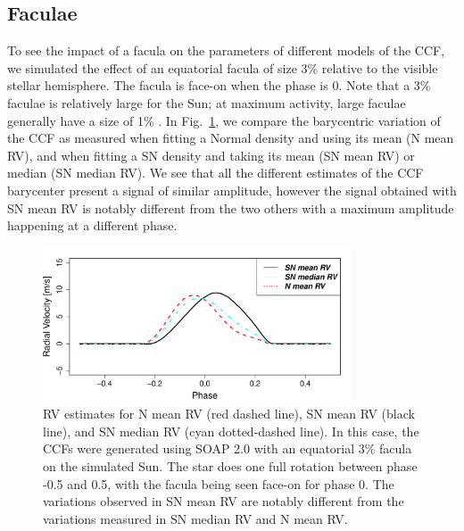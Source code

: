 \documentclass{aa}
\newcommand{\jessi}[1]{{\color{Purple}[[\textbf{Jessi: }#1]]}}
\begin{document}
\subsection{Faculae} \label{sec:soap.faculae}

To see the impact of a facula on the parameters of different models of the CCF, we simulated the effect of an equatorial facula
of size 3\% relative to the visible stellar hemisphere. The facula is face-on when the phase is 0. 
Note that a 3\% faculae is relatively large for the Sun; at maximum activity, large faculae generally have a size of 1\% \citep[e.g.][]{Borgniet-2015}. 
In Fig.~\ref{fig:faculae}, we compare the barycentric variation of the CCF as measured when fitting a Normal density and using its mean (N mean RV), and when fitting a SN density and taking its mean (SN mean RV) or median (SN median RV). We see that all the different estimates of the CCF barycenter present a signal of similar amplitude, however the signal obtained with SN mean RV is notably different from the two others with a maximum amplitude happening at a different phase.

\begin{figure}[htbp]
\begin{center}
\includegraphics[width=3.6in]{RV_comparison_FACULAE.pdf} 
\caption{RV estimates for N mean RV (red dashed line),  SN mean RV (black line), and SN median RV (cyan dotted-dashed line). In this case, the CCFs were generated using SOAP 2.0 with an equatorial 3\% facula on the simulated Sun. The star does one full rotation between phase -0.5 and 0.5, with the facula being seen face-on for phase $0$. The variations observed in SN mean RV are notably different from the variations measured in SN median RV and N mean RV.  
}
    \label{fig:faculae}
\end{center}
\end{figure}
\end{document}
